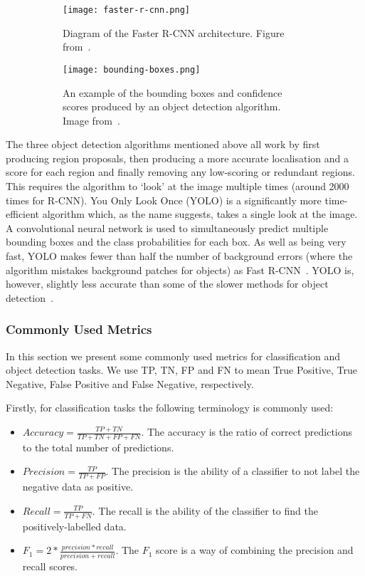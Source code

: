 \documentclass[../interim.tex]{subfiles}
\begin{document}
\begin{figure}
  \begin{subfigure}{0.4\textwidth}
    \centering
    \texttt{[image: faster-r-cnn.png]}
    \caption{Diagram of the Faster R-CNN architecture. Figure from~\cite{cnn-uses:faster-r-cnn}.}
    \label{fig:fasterrcnn}
  \end{subfigure}
  \hfill
  \begin{subfigure}{0.55\textwidth}
    \centering
    \texttt{[image: bounding-boxes.png]}
    \caption{An example of the bounding boxes and confidence scores produced by an object detection algorithm. Image from~\cite{obj-detection-examples}.}
    \label{fig:bounding-boxes}
  \end{subfigure}
  \caption{ }
\end{figure}

The three object detection algorithms mentioned above all work by first producing region proposals, then producing a more accurate localisation and a score for each region and finally removing any low-scoring or redundant regions. This requires the algorithm to `look' at the image multiple times (around 2000 times for R-CNN). You Only Look Once (YOLO) is a significantly more time-efficient algorithm which, as the name suggests, takes a single look at the image. A convolutional neural network is used to simultaneously predict multiple bounding boxes and the class probabilities for each box. As well as being very fast, YOLO makes fewer than half the number of background errors (where the algorithm mistakes background patches for objects) as Fast R-CNN~\cite{yolo}. YOLO is, however, slightly less accurate than some of the slower methods for object detection~\cite{cnn-uses:yolo-v3}.

\subsubsection{Commonly Used Metrics}

In this section we present some commonly used metrics for classification and object detection tasks. We use TP, TN, FP and FN to mean True Positive, True Negative, False Positive and False Negative, respectively.

Firstly, for classification tasks the following terminology is commonly used:
\begin{itemize}
  \item $Accuracy = \frac{TP + TN}{TP + TN + FP + FN}$. The accuracy is the ratio of correct predictions to the total number of predictions.

  \item $Precision = \frac{TP}{TP + FP}$. The precision is the ability of a classifier to not label the negative data as positive.

  \item $Recall = \frac{TP}{TP + FN}$. The recall is the ability of the classifier to find the positively-labelled data.

  \item $F_1 = 2 * \frac{precision * recall}{precision + recall}$. The $F_1$ score is a way of combining the precision and recall scores.
\end{itemize}
\end{document}
